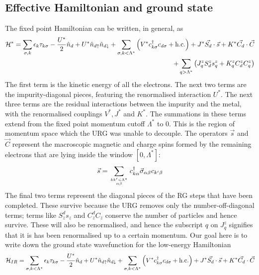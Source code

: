 \documentclass[12pt,twoside]{article}
\numberwithin{equation}{section}
\begin{document}
\subsection{Effective Hamiltonian and ground state}
The fixed point Hamiltonian can be written, in general, as
\begin{equation}\begin{aligned}
	\mathcal{H}^* = \sum_{\sigma, k}\epsilon_k \tau_{k\sigma} - \frac{U^*}{2}\hat n_d + U^* \hat n_{d\uparrow}\hat n_{d\downarrow} + \sum_{\sigma, k < \Lambda^*}\left( V^* c^\dagger_{k\sigma}c_{d\sigma} + \text{h.c.} \right) + J^* \vec{S_d}\cdot\vec{s} + K^* \vec{C_d}\cdot\vec{C} \\
	+ \sum_{q > \Lambda^*}\left(J^z_q S^z_ds^z_q + K^z_q C^z_dC^z_q\right) 
\end{aligned}\end{equation}
The first term is the kinetic energy of all the electrons. The next two terms are the impurity-diagonal pieces, featuring the renormalised interaction \(U^*\). The next three terms are the residual interactions between the impurity and the metal, with the renormalised couplings \(V^*, J^*\) and \(K^*\). The summations in these terms extend from the fixed point momentum cutoff \(\Lambda^*\) to 0. This is the region of momentum space  which the URG was unable to decouple. The operators \(\vec s\) and \(\vec C\) represent the macroscopic magnetic and charge spins formed by the remaining electrons that are lying inside the window \(\left[ 0, \Lambda^* \right] \):
\begin{equation}\begin{aligned}
	\vec s = \sum_{kk^\prime<\Lambda^*\atop{\alpha\beta}} c^\dagger_{k\alpha}\vec \sigma_{\alpha\beta}c_{k^\prime\beta}
\end{aligned}\end{equation}
The final two terms represent the diagonal pieces of the RG steps that have been completed. These survive because the URG removes only the number-off-diagonal terms; terms like \(S^d_z s_z\) and \(C^d_z C_z\) conserve the number of particles and hence survive. These will also be renormalised, and hence the subscript \(q\) on \(J^z_q\) signifies that it is has been renormalised up to a certain momentum.
\pb Our goal here is to write down the ground state wavefunction for the low-energy Hamiltonian
\begin{equation}\begin{aligned}
	\mathcal{H}_{IR} = \sum_{\sigma, k<\Lambda^*}\epsilon_k \tau_{k\sigma} - \frac{U^*}{2}\hat n_d + U^* \hat n_{d\uparrow}\hat n_{d\downarrow} + \sum_{\sigma, k < \Lambda^*}\left( V^* c^\dagger_{k\sigma}c_{d\sigma} + \text{h.c.} \right) + J^* \vec{S_d}\cdot\vec{s} + K^* \vec{C_d}\cdot\vec{C}
\end{aligned}\end{equation}
\end{document}
